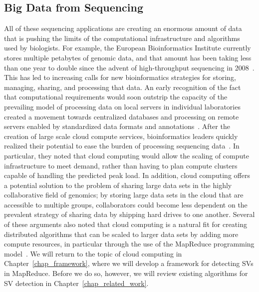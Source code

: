 \subsection{Big Data from Sequencing}

All of these sequencing applications are creating an enormous amount of data that is pushing the limits of the computational infrastructure and algorithms used by biologists. For example, the European Bioinformatics Institute currently stores multiple petabytes of genomic data, and that amount has been taking less than one year to double since the advent of high-throughput sequencing in 2008~\cite{Marx:2013dz}. This has led to increasing calls for new bioinformatics strategies for storing, managing, sharing, and processing that data. An early recognition of the fact that computational requirements would soon outstrip the capacity of the prevailing model of processing data on local servers in individual laboratories created a movement towards centralized databases and processing on remote servers enabled by standardized data formats and annotations~\cite{Stein:2008gh}. After the creation of large scale cloud compute services, bioinformatics leaders quickly realized their potential to ease the burden of processing sequencing data~\cite{Stein:2010gp,Schatz:2010js,Schadt:2010dp}. In particular, they noted that cloud computing would allow the scaling of compute infrastructure to meet demand, rather than having to plan compute clusters capable of handling the predicted peak load. In addition, cloud computing offers a potential solution to the problem of sharing large data sets in the highly collaborative field of genomics; by storing large data sets in the cloud that are accessible to multiple groups, collaborators could become less dependent on the prevalent strategy of sharing data by shipping hard drives to one another. Several of these arguments also noted that cloud computing is a natural fit for creating distributed algorithms that can be scaled to larger data sets by adding more compute resources, in particular through the use of the MapReduce programming model~\cite{Schatz:2010js,Schadt:2010dp}. We will return to the topic of cloud computing in Chapter~\ref{chap_framework}, where we will develop a framework for detecting SVs in MapReduce. Before we do so, however, we will review existing algorithms for SV detection in Chapter~\ref{chap_related_work}.
